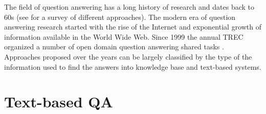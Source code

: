 %

\label{chap:related}



The field of question answering has a long history of research and dates back to 60s (see \cite{Kolomiyets:2011:SQA:2046840.2047162} for a survey of different approaches).
The modern era of question answering research started with the rise of the Internet and exponential growth of information available in the World Wide Web.
Since 1999 the annual TREC organized a number of open domain question answering shared tasks \cite{dang2007overview}.
Approaches proposed over the years can be largely classified by the type of the information used to find the answers into knowledge base and text-based systems.

\section{Text-based QA}

